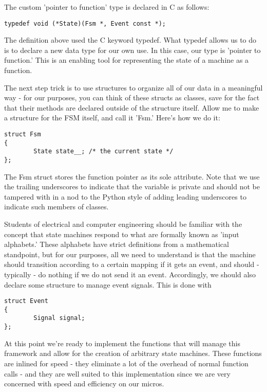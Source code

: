 The custom 'pointer to function' type is declared in C as follows:
\begin{lstlisting}
typedef void (*State)(Fsm *, Event const *);
\end{lstlisting}

The definition above used the C keyword typedef. What typedef allows us to do is to declare a new data type for our own use. In this case, our type is 'pointer to function.' This is an enabling tool for representing the state of a machine as a function.

The next step trick is to use structures to organize all of our data in a meaningful way - for our purposes, you can think of these structs as classes, save for the fact that their methods are declared outside of the structure itself. Allow me to make a structure for the FSM itself, and call it 'Fsm.' Here's how we do it:

\begin{lstlisting}
struct Fsm
{      
        State state__; /* the current state */
};
\end{lstlisting}

The Fsm struct stores the function pointer as its sole attribute. Note that we use the trailing underscores to indicate that the variable is private and should not be tampered with in a nod to the Python style of adding leading underscores to indicate such members of classes. 

Students of electrical and computer engineering should be familiar with the concept that state machines respond to what are formally known as 'input alphabets.' These alphabets have strict definitions from a mathematical standpoint, but for our purposes, all we need to understand is that the machine should transition according to a certain mapping if it gets an event, and should - typically - do nothing if we do not send it an event. Accordingly, we should also declare some structure to manage event signals. This is done with

\begin{lstlisting}
struct Event
{
        Signal signal;
};
\end{lstlisting}

At this point we're ready to implement the functions that will manage this framework and allow for the creation of arbitrary state machines. These functions are inlined for speed - they eliminate a lot of the overhead of normal function calls - and they are well suited to this implementation since we are very concerned with speed and efficiency on our micros.

